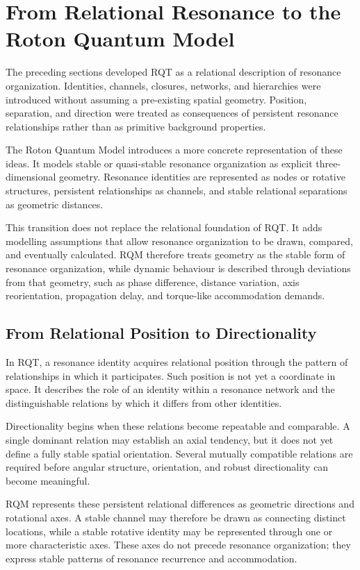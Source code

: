 \documentclass[11pt,a4paper]{article}
\begin{document}
\section{From Relational Resonance to the Roton Quantum Model}

The preceding sections developed RQT as a relational description of resonance organization. Identities, channels, closures, networks, and hierarchies were introduced without assuming a pre-existing spatial geometry. Position, separation, and direction were treated as consequences of persistent resonance relationships rather than as primitive background properties.

The Roton Quantum Model introduces a more concrete representation of these ideas. It models stable or quasi-stable resonance organization as explicit three-dimensional geometry. Resonance identities are represented as nodes or rotative structures, persistent relationships as channels, and stable relational separations as geometric distances.

This transition does not replace the relational foundation of RQT. It adds modelling assumptions that allow resonance organization to be drawn, compared, and eventually calculated. RQM therefore treats geometry as the stable form of resonance organization, while dynamic behaviour is described through deviations from that geometry, such as phase difference, distance variation, axis reorientation, propagation delay, and torque-like accommodation demands.


\subsection{From Relational Position to Directionality}

In RQT, a resonance identity acquires relational position through the pattern of relationships in which it participates. Such position is not yet a coordinate in space. It describes the role of an identity within a resonance network and the distinguishable relations by which it differs from other identities.

Directionality begins when these relations become repeatable and comparable. A single dominant relation may establish an axial tendency, but it does not yet define a fully stable spatial orientation. Several mutually compatible relations are required before angular structure, orientation, and robust directionality can become meaningful.

RQM represents these persistent relational differences as geometric directions and rotational axes. A stable channel may therefore be drawn as connecting distinct locations, while a stable rotative identity may be represented through one or more characteristic axes. These axes do not precede resonance organization; they express stable patterns of resonance recurrence and accommodation.
\end{document}
